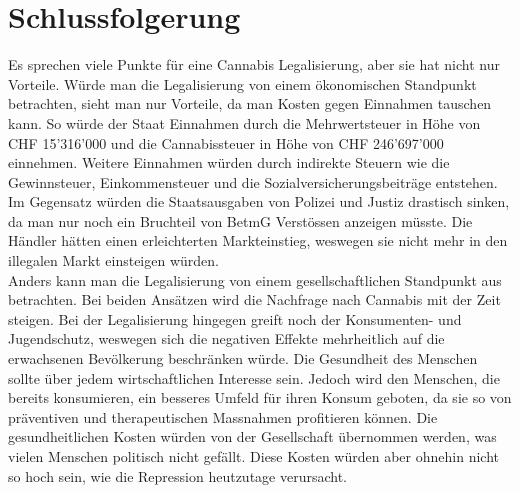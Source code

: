 \documentclass[../main.tex]{subfiles}
\begin{document}
	\section{Schlussfolgerung}
	Es sprechen viele Punkte für eine Cannabis Legalisierung, aber sie hat nicht nur Vorteile.
	Würde man die Legalisierung von einem ökonomischen Standpunkt betrachten, sieht man nur Vorteile, da man Kosten gegen Einnahmen tauschen kann.
	So würde der Staat Einnahmen durch die Mehrwertsteuer in Höhe von CHF 15'316'000 und die Cannabissteuer in Höhe von CHF 246'697'000 einnehmen.
	Weitere Einnahmen würden durch indirekte Steuern wie die Gewinnsteuer, Einkommensteuer und die Sozialversicherungsbeiträge entstehen.
	Im Gegensatz würden die Staatsausgaben von Polizei und Justiz drastisch sinken, da man nur noch ein Bruchteil von BetmG Verstössen anzeigen müsste.
	Die Händler hätten einen erleichterten Markteinstieg, weswegen sie nicht mehr in den illegalen Markt einsteigen würden.\\
	
	\noindent
	Anders kann man die Legalisierung von einem gesellschaftlichen Standpunkt aus betrachten.
	Bei beiden Ansätzen wird die Nachfrage nach Cannabis mit der Zeit steigen.
	Bei der Legalisierung hingegen greift noch der Konsumenten- und Jugendschutz, weswegen sich die negativen Effekte mehrheitlich auf die erwachsenen Bevölkerung beschränken würde.
	Die Gesundheit des Menschen sollte über jedem wirtschaftlichen Interesse sein.
	Jedoch wird den Menschen, die bereits konsumieren, ein besseres Umfeld für ihren Konsum geboten, da sie so von präventiven und therapeutischen Massnahmen profitieren können.
	Die gesundheitlichen Kosten würden von der Gesellschaft übernommen werden, was vielen Menschen politisch nicht gefällt.
	Diese Kosten würden aber ohnehin nicht so hoch sein, wie die Repression heutzutage verursacht.
	
	
	
\end{document}
